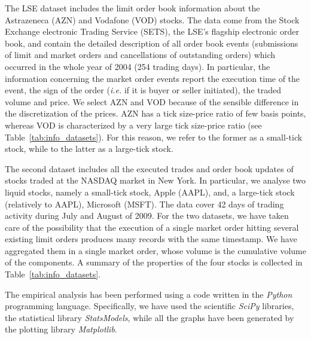 \documentclass[12pt]{iopart}
\begin{document}
The LSE dataset includes the limit order book information about the Astrazeneca (AZN) and Vodafone (VOD) stocks. The data come from the Stock Exchange electronic Trading Service (SETS), the LSE's flagship electronic order book, and contain the detailed description of all order book events (submissions of limit and market orders and cancellations of outstanding orders) which occurred in the whole year of 2004 (254 trading days). In particular, the information concerning the market order events report the execution time of the event, the sign of the order (\emph{i.e.} if it is buyer or seller initiated), the traded volume and price. We select AZN and VOD because of the sensible difference in the discretization of the prices. AZN has a tick size-price ratio of few basis points, whereas VOD is characterized by a very large tick size-price ratio (see Table~\ref{tab:info_datasets}). For this reason, we refer to the former as a small-tick stock, while to the latter as a large-tick stock.

The second dataset includes all the executed trades and order book updates of stocks traded at the NASDAQ market in New York. In particular, we analyse two liquid stocks, namely a small-tick stock, Apple (AAPL), and, a large-tick stock (relatively to AAPL), Microsoft (MSFT). The data cover 42 days of trading activity during July and August of 2009. For the two datasets, we have taken care of the possibility that the execution of a single market order hitting several existing limit orders produces many records with the same timestamp. We have aggregated them in a single market order, whose volume is the cumulative volume of the components. A summary of the properties of the four stocks is collected in Table~\ref{tab:info_datasets}.

The empirical analysis has been performed using a code written in the \textit{Python} programming language. Specifically, we have used the scientific \textit{SciPy} libraries, the statistical library \textit{StatsModels}, while all the graphs have been generated by the plotting library \textit{Matplotlib}.
\end{document}
